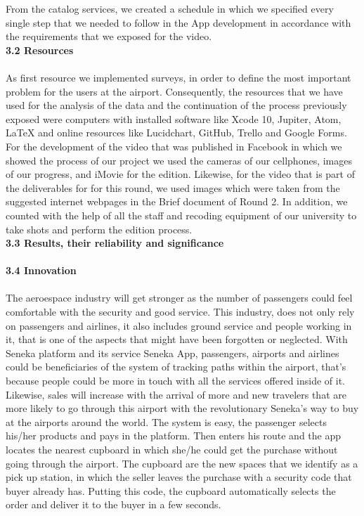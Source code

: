 \documentclass[]{article}
\begin{document}
From the catalog services, we created a schedule in which we specified every single step that we needed to follow in the App development in accordance with the requirements that we exposed for the video.\\
[0.6cm]

\Large{\textbf{3.2 Resources}\\}\\

As first resource we implemented surveys, in order to define the most important problem for the users at the airport. Consequently,  the resources that we have used for the analysis of the data and the continuation of the process previously exposed were computers with installed software like Xcode 10, Jupiter, Atom, LaTeX and online resources like Lucidchart, GitHub, Trello and Google Forms.\\  

For the development of the video that was published in Facebook in which we showed the process of our project we used the cameras of our cellphones, images of our progress, and iMovie for the edition. Likewise, for the video that is part of the deliverables for for this round, we used images which were taken from the suggested internet webpages in the Brief document of Round 2. In addition, we counted with the help of all the staff and recoding equipment of our university to take shots and perform the edition process.\\ 


\Large{\textbf{3.3 Results, their reliability and significance}\\}\\


\Large{\textbf{3.4 Innovation}\\}\\

The aeroespace industry will get stronger as the number of passengers could feel comfortable with the security and good service. This industry, does not only rely on passengers and airlines, it also includes ground service and people working in it, that is one of the aspects that might have been forgotten or neglected. With Seneka platform and its service Seneka App, passengers, airports and airlines could be beneficiaries of the system of tracking paths within the airport, that's because people could be more in touch with all the services offered inside of it.\\

Likewise, sales will increase with the arrival of more and new travelers that are more likely to go through this airport with the revolutionary Seneka's way to buy at the airports around the world. The system is easy, the passenger selects his/her products and pays in the platform. Then enters his route and the app locates the nearest cupboard in which she/he could get the purchase without going through the airport. The cupboard are the new spaces that we identify as a pick up station, in which the seller leaves the purchase with a security code that buyer already has. Putting this code, the cupboard automatically selects the order and deliver it to the buyer in a few seconds.\\
\end{document}
